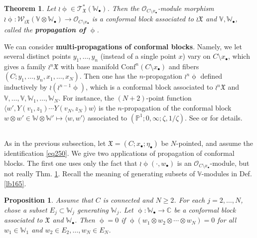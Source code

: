 \documentclass[12pt,a4paper,notitlepage]{article}
\theoremstyle{definition}
\theoremstyle{plain}
\newtheorem{thm}[df]{Theorem}
\newtheorem{pp}[df]{Proposition}
\newcommand{\fk}{\mathfrak}
\newcommand{\Conf}{\mathrm{Conf}}
\newcommand{\bk}[1]{\langle {#1}\rangle}
\newcommand{\scr}{\mathscr}
\newcommand{\blt}{\bullet}
\newcommand{\Vbb}{\mathbb V}
\newcommand{\Wbb}{\mathbb W}
\newcommand{\Cbb}{\mathbb C}
\newcommand{\Pbb}{\mathbb P}
\numberwithin{equation}{section}
\begin{document}
\begin{thm}\label{lb161}
Let $\wr\upphi\in\scr T_{\fk X}^*(\Wbb_\blt)$. Then the $\scr O_{C\setminus x_\blt}$-module morphism $\wr\upphi:\scr W_{\wr\fk X}(\Vbb\otimes\Wbb_\blt)\rightarrow\scr O_{C\setminus x_\blt}$ is a conformal block associated to $\wr\fk X$ and $\Vbb,\Wbb_\blt$, called the \textbf{propagation of $\upphi$}. 
\end{thm}



We can consider \textbf{multi-propagations of conformal blocks}. Namely, we let several distinct points $y_1,\dots,y_n$ (instead of a single point $x$) vary on $C\setminus x_\blt$, which gives a family $\wr^n\fk X$ with base manifold $\Conf^n(C\setminus x_\blt)$ and fibers $(C;y_1,\dots,y_n,x_1,\dots,x_N)$. Then one has the  $n$-propagation $\wr^n\upphi$ defined inductively by $\wr(\wr^{n-1}\upphi)$, which is a conformal block associated to $\wr^n\fk X$ and $\Vbb,\dots,\Vbb,\Wbb_1,\dots,\Wbb_N$. For instance, the $(N+2)$-point function $\bk{w',Y(v_1,z_1)\cdots Y(v_N,z_N)w}$ is the $n$-propagation of the conformal block $w\otimes w'\in\Wbb\otimes\Wbb'\mapsto \bk{w,w'}$ associated to $(\Pbb^1;0,\infty;\zeta,1/\zeta)$. See \cite[Sec. 3.4]{Gui} or \cite{Gui21} for details.



\subsection{}




As in the previous subsection, let $\fk X=(C;x_\blt;\eta_\blt)$ be $N$-pointed, and assume the identification \eqref{eq250}. We give two applications of propagation of conformal blocks. The first one uses only the fact that $\wr\upphi(\cdot,w_\blt)$ is an $\scr O_{C\setminus x_\blt}$-module, but not really Thm. \ref{lb161}. Recall the meaning of generating subsets of $\Vbb$-modules in Def. \ref{lb165}.


\begin{pp}\label{lb167}
Assume that $C$ is connected and $N\geq 2$. For each $j=2,\dots,N$, chose a subset $E_j\subset \Wbb_j$ generating $\Wbb_j$. Let $\upphi:\Wbb_\blt\rightarrow\Cbb$ be a conformal block associated to $\fk X$ and $\Wbb_\blt$. Then $\upphi=0$ if $\upphi(w_1\otimes w_2\otimes\cdots\otimes w_N)=0$ for all $w_1\in\Wbb_1$ and $w_2\in E_2,\dots,w_N\in E_N$.
\end{pp}
\end{document}
